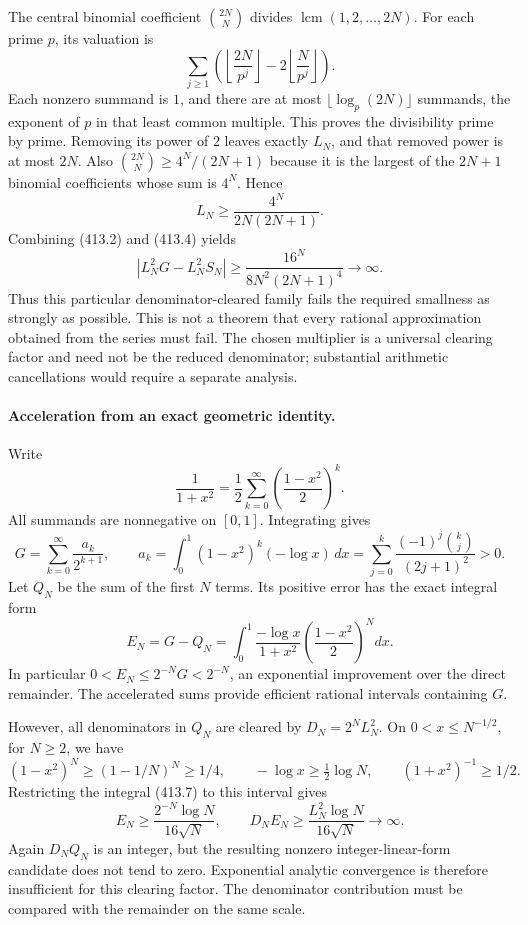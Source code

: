 \documentclass[11pt]{article}
\begin{document}
The central binomial coefficient $\binom{2N}{N}$ divides $\operatorname{lcm}(1,2,\ldots,2N)$. For each prime $p$, its valuation is
\[
 \sum_{j\ge1}\left(\left\lfloor\frac{2N}{p^j}\right\rfloor
              -2\left\lfloor\frac{N}{p^j}\right\rfloor\right).
\]
Each nonzero summand is $1$, and there are at most $\lfloor\log_p(2N)\rfloor$ summands, the exponent of $p$ in that least common multiple. This proves the divisibility prime by prime. Removing its power of $2$ leaves exactly $L_N$, and that removed power is at most $2N$. Also $\binom{2N}{N}\ge4^N/(2N+1)$ because it is the largest of the $2N+1$ binomial coefficients whose sum is $4^N$. Hence
\[
 L_N\ge\frac{4^N}{2N(2N+1)}. \tag{413.4}
\]
Combining (413.2) and (413.4) yields
\[
 |L_N^2G-L_N^2S_N|
 \ge\frac{16^N}{8N^2(2N+1)^4}\longrightarrow\infty.
 \tag{413.5}
\]
Thus this particular denominator-cleared family fails the required smallness as strongly as possible. This is not a theorem that every rational approximation obtained from the series must fail. The chosen multiplier is a universal clearing factor and need not be the reduced denominator; substantial arithmetic cancellations would require a separate analysis.

\paragraph{Acceleration from an exact geometric identity.}
Write
\[
 \frac1{1+x^2}=\frac12\sum_{k=0}^{\infty}
                      \left(\frac{1-x^2}{2}\right)^k.
\]
All summands are nonnegative on $[0,1]$. Integrating gives
\[
 G=\sum_{k=0}^{\infty}\frac{a_k}{2^{k+1}},\qquad
 a_k=\int_0^1(1-x^2)^k(-\log x)\,dx
     =\sum_{j=0}^k\frac{(-1)^j\binom kj}{(2j+1)^2}>0.
 \tag{413.6}
\]
Let $Q_N$ be the sum of the first $N$ terms. Its positive error has the exact integral form
\[
 E_N=G-Q_N
 =\int_0^1\frac{-\log x}{1+x^2}
                \left(\frac{1-x^2}{2}\right)^Ndx.
 \tag{413.7}
\]
In particular $0<E_N\le2^{-N}G<2^{-N}$, an exponential improvement over the direct remainder. The accelerated sums provide efficient rational intervals containing $G$.

However, all denominators in $Q_N$ are cleared by $D_N=2^NL_N^2$. On $0<x\le N^{-1/2}$, for $N\ge2$, we have
\[
 (1-x^2)^N\ge(1-1/N)^N\ge1/4,\qquad
 -\log x\ge\tfrac12\log N,\qquad (1+x^2)^{-1}\ge1/2.
\]
Restricting the integral (413.7) to this interval gives
\[
 E_N\ge\frac{2^{-N}\log N}{16\sqrt N},\qquad
 D_NE_N\ge\frac{L_N^2\log N}{16\sqrt N}\longrightarrow\infty.
 \tag{413.8}
\]
Again $D_NQ_N$ is an integer, but the resulting nonzero integer-linear-form candidate does not tend to zero. Exponential analytic convergence is therefore insufficient for this clearing factor. The denominator contribution must be compared with the remainder on the same scale.
\end{document}
